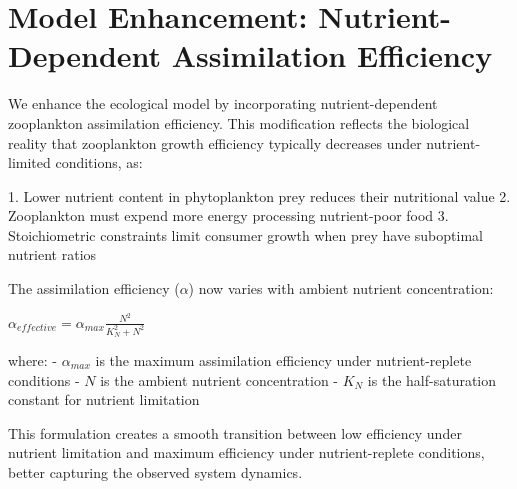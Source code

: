 \section{Model Enhancement: Nutrient-Dependent Assimilation Efficiency}

We enhance the ecological model by incorporating nutrient-dependent zooplankton assimilation efficiency. This modification reflects the biological reality that zooplankton growth efficiency typically decreases under nutrient-limited conditions, as:

1. Lower nutrient content in phytoplankton prey reduces their nutritional value
2. Zooplankton must expend more energy processing nutrient-poor food
3. Stoichiometric constraints limit consumer growth when prey have suboptimal nutrient ratios

The assimilation efficiency ($\alpha$) now varies with ambient nutrient concentration:

$\alpha_{effective} = \alpha_{max} \frac{N^2}{K_N^2 + N^2}$

where:
- $\alpha_{max}$ is the maximum assimilation efficiency under nutrient-replete conditions
- $N$ is the ambient nutrient concentration
- $K_N$ is the half-saturation constant for nutrient limitation

This formulation creates a smooth transition between low efficiency under nutrient limitation and maximum efficiency under nutrient-replete conditions, better capturing the observed system dynamics.
